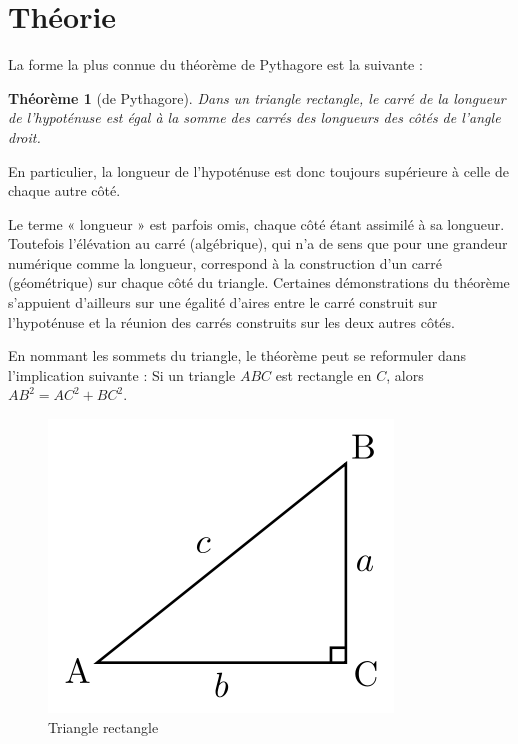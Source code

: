 \documentclass{book}
\newtheorem{theoreme}{Théorème}
\begin{document}
\section{Théorie}

La forme la plus connue du théorème de Pythagore\cite{wiki2016pythagore} est la suivante :

\begin{theoreme}[de Pythagore]
Dans un triangle rectangle, le carré de la longueur de l’hypoténuse est égal à la somme des carrés des longueurs des côtés de l’angle droit.
\end{theoreme}

En particulier, la longueur de l’hypoténuse est donc toujours supérieure à celle de chaque autre côté.

Le terme « longueur » est parfois omis, chaque côté étant assimilé à sa longueur. Toutefois l’élévation au carré (algébrique), qui n’a de sens que pour une grandeur numérique comme la longueur, correspond à la construction d’un carré (géométrique) sur chaque côté du triangle. Certaines démonstrations du théorème s’appuient d’ailleurs sur une égalité d’aires entre le carré construit sur l’hypoténuse et la réunion des carrés construits sur les deux autres côtés.

En nommant les sommets du triangle, le théorème peut se reformuler dans l’implication suivante : Si un triangle $ABC$ est rectangle en $C$, alors $AB^{2} = AC^{2} + BC^{2}$.

\begin{figure}
\begin{center}
\includegraphics{img/exemple.png}
\end{center}
\caption{Triangle rectangle}
\label{Triangle rectangle}
\end{figure}
\end{document}
